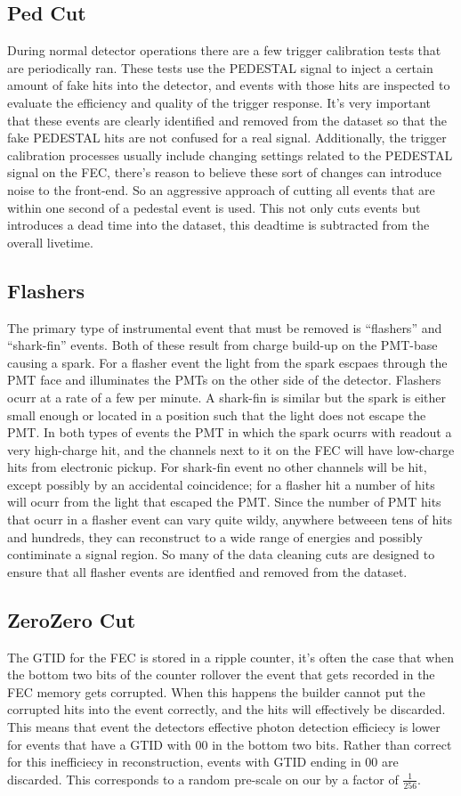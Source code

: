 \subsection{Ped Cut}
During normal detector operations there are a few trigger calibration
tests that are periodically ran.
These tests use the PEDESTAL signal to inject a certain amount of fake hits
into the detector, and events with those hits are inspected to evaluate the efficiency and
quality of the trigger response.
It's very important that these events are clearly identified and removed from the
dataset so that the fake PEDESTAL hits are not confused for a real signal.
Additionally, the trigger calibration processes usually include changing settings
related to the PEDESTAL signal on the FEC, there's reason to believe these sort
of changes can introduce noise to the front-end.
So an aggressive approach of cutting all events that are within one second of
a pedestal event is used.
This not only cuts events but introduces a dead time into the dataset,
this deadtime is subtracted from the overall livetime.
\subsection{Flashers}
The primary type of instrumental event that must be removed is ``flashers'' and
``shark-fin'' events.
Both of these result from charge build-up on the PMT-base causing a
spark.
For a flasher event the light from the spark escpaes through the PMT face
and illuminates the PMTs on the other side of the detector.
Flashers ocurr at a rate of a few per minute.
A shark-fin is similar but the spark is either small enough or located
in a position such that the light does not escape the PMT.
In both types of events the PMT in which the spark ocurrs with readout
a very high-charge hit, and the channels next to it on the FEC will
have low-charge hits from electronic pickup.
For shark-fin event no other channels will be hit, except possibly by an
accidental coincidence; for a flasher hit a number of hits will
ocurr from the light that escaped the PMT.
Since the number of PMT hits that ocurr in a flasher event can vary quite wildy,
anywhere betweeen tens of hits and hundreds, they can reconstruct
to a wide range of energies and possibly contiminate a signal region.
So many of the data cleaning cuts are designed to ensure that all
flasher events are identfied and removed from the dataset.

\subsection{ZeroZero Cut}
The GTID for the FEC is stored in a ripple counter, it's often the case that
when the bottom two bits of the counter rollover the event that gets recorded in
the FEC memory gets corrupted.
When this happens the builder cannot put the corrupted hits into the event correctly,
and the hits will effectively be discarded.
This means that event the detectors effective photon detection efficiecy is lower
for events that have a GTID with $00$ in the bottom two bits.
Rather than correct for this inefficiecy in reconstruction, events with GTID
ending in $00$ are discarded. This corresponds to a random pre-scale
on our by a factor of $\frac{1}{256}$.
